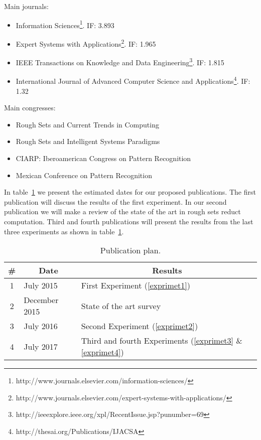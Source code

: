 \documentclass[11pt]{article}   %
\begin{document}
  Main journals:
  \begin{itemize}
 	\item Information Sciences\footnote{http://www.journals.elsevier.com/information-sciences/}. IF: 3.893
 	\item Expert Systems with 
 		  Applications\footnote{http://www.journals.elsevier.com/expert-systems-with-applications/}. IF: 1.965
 	\item IEEE Transactions on Knowledge and Data
 		  Engineering\footnote{http://ieeexplore.ieee.org/xpl/RecentIssue.jsp?punumber=69}. IF: 1.815
 	\item International Journal of Advanced Computer Science and
 		  Applications\footnote{http://thesai.org/Publications/IJACSA}. IF: 1.32
  \end{itemize}
 
  Main congresses:
  \begin{itemize}
 	\item Rough Sets and Current Trends in Computing
 	\item Rough Sets and Intelligent Systems Paradigms
 	\item CIARP: Iberoamerican Congress on Pattern Recognition
 	\item Mexican Conference on Pattern Recognition
  \end{itemize}
  
  In table~\ref{tab_PP} we present the estimated dates for our proposed publications. The first publication will
  discuss the results of the first experiment. In our second publication we will make a review of the state of 
  the art in rough sets reduct computation. Third and fourth publications will present the results from the last
  three experiments as shown in table~\ref{tab_PP}.
  
     \begin{table}[htb]
		\caption{Publication plan.} \label{tab_PP}
		\centering
 	\begin{tabular}{c||l|l}
 		\# & \multicolumn{1}{c|}{Date} & \multicolumn{1}{c}{Results}\\
 		\hline \hline
		1 & July 2015 & First Experiment (\ref{exprimet1})\\
		2 & December 2015 & State of the art survey \\
		3 & July 2016 & Second Experiment (\ref{exprimet2})\\
		4 & July 2017 & Third and fourth Experiments (\ref{exprimet3} \& \ref{exprimet4})\\
 	\end{tabular}             
 	\end{table}
\end{document}

